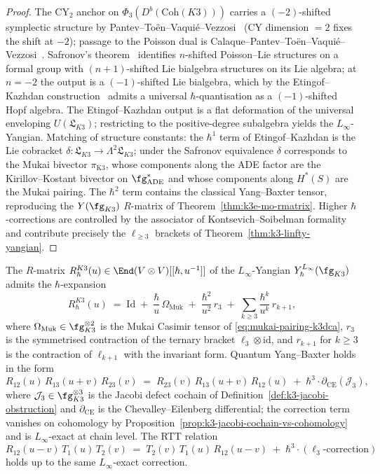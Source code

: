 \begin{proof}
The CY$_2$ anchor on $\Phi_3(D^b(\mathrm{Coh}(K3)))$ carries a
$(-2)$-shifted symplectic structure by
Pantev--To\"en--Vaqui\'e--Vezzosi~\cite{PTVV2013}
(CY dimension $= 2$ fixes the shift at $-2$); passage to the Poisson
dual is Calaque--Pantev--To\"en--Vaqui\'e--Vezzosi~\cite{CPTVV2017}.
Safronov's theorem~\cite[Thm.~1.1]{Safronov2017} identifies
$n$-shifted Poisson--Lie structures on a formal group with
$(n + 1)$-shifted Lie bialgebra structures on its Lie algebra; at
$n = -2$ the output is a $(-1)$-shifted Lie bialgebra, which by the
Etingof--Kazhdan construction~\cite{EtingofKazhdan1996} admits a
universal $\hbar$-quantisation as a $(-1)$-shifted Hopf algebra.
The Etingof--Kazhdan output is a flat deformation of the universal
enveloping $U(\mathfrak{L}_{K3})$; restricting to the positive-degree
subalgebra yields the $L_\infty$-Yangian. Matching of structure
constants: the $\hbar^1$ term of Etingof--Kazhdan is the Lie cobracket
$\delta : \mathfrak{L}_{K3} \to \Lambda^2 \mathfrak{L}_{K3}$; under
the Safronov equivalence $\delta$ corresponds to the Mukai bivector
$\pi_{\mathrm{K3}}$, whose components along the ADE factor are the
Kirillov--Kostant bivector on $\fg_{\mathrm{ADE}}^*$ and whose
components along $H^*(S)$ are the Mukai pairing. The $\hbar^2$ term
contains the classical Yang--Baxter tensor, reproducing the
$Y(\fg_{K3})$ $R$-matrix of
Theorem~\ref{thm:k3e-mo-rmatrix}. Higher $\hbar$-corrections are
controlled by the associator of Kontsevich--Soibelman formality
\cite{KontsevichSoibelman2009} and contribute precisely the
$\ell_{\geq 3}$ brackets of Theorem~\ref{thm:k3-linfty-yangian}.
\end{proof}

\begin{corollary}
\label{cor:rtt-linfty-compatibility}
The $R$-matrix $R_\hbar^{K3}(u) \in
\End(V \otimes V)[[\hbar, u^{-1}]]$ of the $L_\infty$-Yangian
$Y_\hbar^{L_\infty}(\fg_{K3})$ admits the $\hbar$-expansion
\[
 R_\hbar^{K3}(u)
 \;=\; \mathrm{Id}
 \;+\; \frac{\hbar}{u}\,\Omega_{\mathrm{Muk}}
 \;+\; \frac{\hbar^2}{u^2}\,r_3
 \;+\; \sum_{k \geq 3} \frac{\hbar^k}{u^k}\,r_{k + 1},
\]
where $\Omega_{\mathrm{Muk}} \in \fg_{K3}^{\otimes 2}$ is the Mukai
Casimir tensor of \eqref{eq:mukai-pairing-k3dca}, $r_3$ is the
symmetrised contraction of the ternary bracket
$\ell_3 \otimes \mathrm{id}$, and $r_{k+1}$ for $k \geq 3$ is the
contraction of $\ell_{k+1}$ with the invariant form. Quantum
Yang--Baxter holds in the form
\[
 R_{12}(u)\,R_{13}(u + v)\,R_{23}(v)
 \;=\; R_{23}(v)\,R_{13}(u + v)\,R_{12}(u)
 \;+\; \hbar^3 \cdot \partial_{\mathrm{CE}}(\mathcal{J}_3),
\]
where $\mathcal{J}_3 \in \fg_{K3}^{\otimes 3}$ is the Jacobi defect
cochain of Definition~\ref{def:k3-jacobi-obstruction} and
$\partial_{\mathrm{CE}}$ is the Chevalley--Eilenberg differential;
the correction term vanishes on cohomology by
Proposition~\ref{prop:k3-jacobi-cochain-vs-cohomology} and is
$L_\infty$-exact at chain level. The RTT relation
\[
 R_{12}(u - v)\,T_1(u)\,T_2(v)
 \;=\; T_2(v)\,T_1(u)\,R_{12}(u - v)
 \;+\; \hbar^3 \cdot (\ell_3\text{-correction})
\]
holds up to the same $L_\infty$-exact correction.
\end{corollary}

